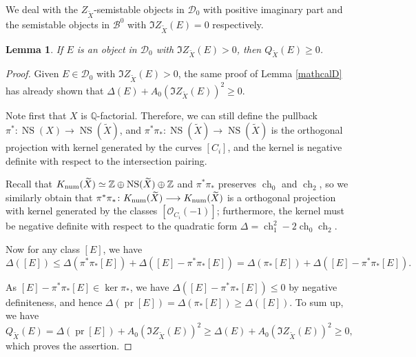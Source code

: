 \documentclass[12pt]{amsart}
\newtheorem{lemma}[theorem]{Lemma}
\theoremstyle{definition}
\DeclareMathOperator{\num}{num}
\DeclareMathOperator{\ch}{ch}
\DeclareMathOperator{\NS}{NS}
\DeclareMathOperator{\pr}{pr}
\begin{document}
We deal with the $Z_{\widetilde{X}}$-semistable objects in $\mathcal{D}_0$ with positive imaginary part and the semistable objects in $\mathcal{B}^0$ with $\Im Z_{\widetilde{X}}(E)=0$ respectively.
\begin{lemma}\label{6.8'}
If $E$ is an object in $\mathcal{D}_0$ with $\Im Z_{\widetilde{X}}(E)>0$, 
then $Q_{\widetilde{X}}(E) \geq 0$.
\end{lemma}
\begin{proof}
Given $E\in \mathcal{D}_0$ with $\Im Z_{\widetilde{X}}(E)>0$, 
the same proof of Lemma \ref{mathcalD} has already shown that $\Delta(E)+A_0 (\Im Z_{\widetilde{X}}(E))^2 \geq 0.$

Note first that $X$ is $\mathbb{Q}$-factorial.
Therefore, we can still define the pullback $\pi^\ast \colon \NS(X) \longrightarrow \NS(\widetilde{X})$,
and $\pi^\ast \pi_\ast \colon \NS(\widetilde{X}) \longrightarrow \NS(\widetilde{X})$ is the orthogonal projection with kernel generated by the curves $[C_i]$,
and the kernel is negative definite with respect to the intersection pairing.

Recall that ${\rm K}_{\num}(\widetilde{X}) \simeq \mathbb{Z} \oplus \NS(\widetilde{X}) \oplus \mathbb{Z}$ and $\pi^\ast \pi_\ast$ preserves $\ch_0$ and $\ch_2$,
so we similarly obtain that $\pi^\ast \pi_\ast \colon {\rm K}_{\num}(\widetilde{X}) \longrightarrow {\rm K}_{\num}(\widetilde{X})$ is a orthogonal projection with kernel generated by the classes $[\mathcal{O}_{C_i}(-1)]$; 
furthermore, the kernel must be negative definite with respect to the quadratic form $\Delta = \ch_1^2-2\ch_0\ch_2$.

Now for any class $[E]$, 
we have $$\Delta ([E]) \leq \Delta (\pi^\ast \pi_\ast [E])+\Delta ([E] - \pi^\ast \pi_\ast [E]) =  \Delta (\pi_\ast [E])+\Delta ([E] - \pi^\ast \pi_\ast [E]).$$ 

As $[E] - \pi^\ast \pi_\ast [E] \in \ker \pi_\ast$, we have $\Delta ([E] - \pi^\ast \pi_\ast [E])\leq0$ by negative definiteness, and hence $\Delta(\pr [E]) = \Delta(\pi_\ast [E]) \geq \Delta([E])$.
To sum up, we have
\[Q_{\widetilde{X}}(E) = \Delta (\pr [E]) + A_0 (\Im Z_{\widetilde{X}}(E))^2 \geq \Delta(E)+A_0 (\Im Z_{\widetilde{X}}(E))^2 \geq 0,\]
which proves the assertion.
\end{proof}
\end{document}
